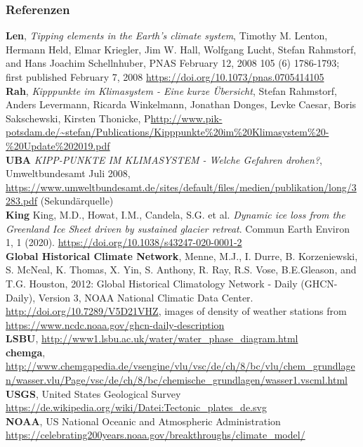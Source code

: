 \begin{frame}
	\frametitle{Referenzen}
	\small{
	\textbf{Len}, \textit{Tipping elements in the Earth's climate system},
	Timothy M. Lenton, Hermann Held, Elmar Kriegler, Jim W. Hall, Wolfgang Lucht, Stefan Rahmstorf, and Hans Joachim Schellnhuber,
	PNAS February 12, 2008 105 (6) 1786-1793; first published February 7, 2008 \url{https://doi.org/10.1073/pnas.0705414105}\\
	\textbf{Rah}, \textit{Kipppunkte im Klimasystem - Eine kurze Übersicht},
	Stefan Rahmstorf, Anders Levermann, Ricarda Winkelmann, Jonathan Donges, Levke Caesar, Boris Sakschewski, Kirsten Thonicke,
	P\url{http://www.pik-potsdam.de/~stefan/Publications/Kipppunkte\%20im\%20Klimasystem\%20-\%20Update\%202019.pdf} \\
	\textbf{UBA} \textit{KIPP-PUNKTE IM KLIMASYSTEM - Welche Gefahren drohen?}, Umweltbundesamt Juli 2008, \url{https://www.umweltbundesamt.de/sites/default/files/medien/publikation/long/3283.pdf} (Sekundärquelle)\\
	\textbf{King} King, M.D., Howat, I.M., Candela, S.G. et al. \textit{Dynamic ice loss from the Greenland Ice Sheet driven by sustained glacier retreat}. Commun Earth Environ 1, 1 (2020). \url{https://doi.org/10.1038/s43247-020-0001-2}\\
	\textbf{Global Historical Climate Network}, Menne, M.J., I. Durre, B. Korzeniewski, S. McNeal, K. Thomas, X. Yin, S. Anthony, R. Ray, R.S. Vose, B.E.Gleason, and T.G. Houston, 2012: Global Historical Climatology Network - Daily (GHCN-Daily), Version 3, NOAA National Climatic Data Center. \url{http://doi.org/10.7289/V5D21VHZ}, images of density of weather stations from \url{https://www.ncdc.noaa.gov/ghcn-daily-description}\\
	\textbf{LSBU}, \url{http://www1.lsbu.ac.uk/water/water_phase_diagram.html}\\
	\textbf{chemga}, \url{http://www.chemgapedia.de/vsengine/vlu/vsc/de/ch/8/bc/vlu/chem_grundlagen/wasser.vlu/Page/vsc/de/ch/8/bc/chemische_grundlagen/wasser1.vscml.html}\\
	\textbf{USGS}, United States Geological Survey \url{https://de.wikipedia.org/wiki/Datei:Tectonic_plates_de.svg}\\
	\textbf{NOAA}, US National Oceanic and Atmospheric Administration \url{https://celebrating200years.noaa.gov/breakthroughs/climate_model/}\\
	}
\end{frame}
